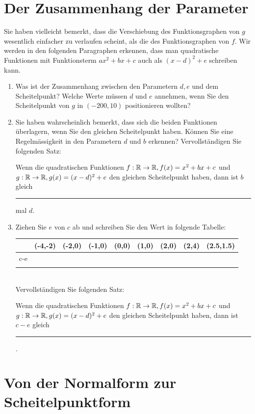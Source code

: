 \documentclass[12pt]{article}
\begin{document}
\section{Der Zusammenhang der Parameter}
Sie haben vielleicht bemerkt, dass die Verschiebung des Funktionsgraphen von $g$ wesentlich einfacher zu verlaufen scheint, als die des Funktionsgraphen von $f$. Wir werden in den folgenden Paragraphen erkennen, dass man quadratische Funktionen mit Funktionsterm $ax^2 + bx + c$ auch als $(x-d)^2 +e$ schreiben kann.
\begin{enumerate}[label=\alph*)]
\item Was ist der Zusammenhang zwischen den Parametern $d,e$ und dem Scheitelpunkt? Welche Werte müssen $d$ und $e$ annehmen, wenn Sie den Scheitelpunkt von $g$ in $(-200, 10)$ positionieren wollten?
\item Sie haben wahrscheinlich bemerkt, dass sich die beiden Funktionen überlagern, wenn Sie den gleichen Scheitelpunkt haben. Können Sie eine Regelmässigkeit in den Parametern $d$ und $b$ erkennen? Vervollständigen Sie folgenden Satz:
\begin{whitebox}\footnotesize
Wenn die quadratischen Funktionen $f: \mathbb{R} \rightarrow \mathbb{R}, f(x) = x^2 + bx + c$  und $g: \mathbb{R} \rightarrow \mathbb{R}, g(x) = (x-d)^2 + e$  den gleichen Scheitelpunkt haben, dann ist $b$ gleich \rule{1cm}{0.5pt} mal $d$.
\end{whitebox}
\item Ziehen Sie $e$ von $c$ ab und schreiben Sie den Wert in folgende Tabelle:
{\scriptsize
\begin{tabularx}{\linewidth}{|X|X|X|X|X|X|X|X|X|}
\toprule
&(-4,-2) & (-2,0)& (-1,0)& (0,0)& (1,0) & (2,0) & (2,4) & (2.5,1.5)\\
\midrule
c-e & & & & & & & & \\
& & & & & & & & \\
\bottomrule
\end{tabularx}}\\[1em]
Vervollständigen Sie folgenden Satz:
\begin{whitebox}\footnotesize
Wenn die quadratischen Funktionen $f: \mathbb{R} \rightarrow \mathbb{R}, f(x) = x^2 + bx + c$  und $g: \mathbb{R} \rightarrow \mathbb{R}, g(x) = (x-d)^2 + e$  den gleichen Scheitelpunkt haben, dann ist $c-e$ gleich \rule{1cm}{0.5pt}.
\end{whitebox}
\end{enumerate}

\section{Von der Normalform zur Scheitelpunktform}
\end{document}
